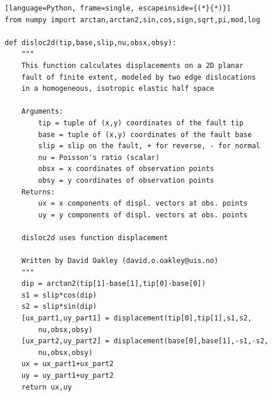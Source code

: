 \documentclass[a4paper , 12pt]{book}
\begin{document}
\begin{center}
\begin{lstlisting}[language=Python, frame=single, escapeinside={(*}{*)}]
from numpy import arctan,arctan2,sin,cos,sign,sqrt,pi,mod,log

def disloc2d(tip,base,slip,nu,obsx,obsy):
	"""
	This function calculates displacements on a 2D planar 
	fault of finite extent, modeled by two edge dislocations 
	in a homogeneous, isotropic elastic half space
	
	Arguments:
		tip = tuple of (x,y) coordinates of the fault tip
		base = tuple of (x,y) coordinates of the fault base
		slip = slip on the fault, + for reverse, - for normal
		nu = Poisson's ratio (scalar)
		obsx = x coordinates of observation points 
		obsy = y coordinates of observation points
	Returns:
		ux = x components of displ. vectors at obs. points 
		uy = y components of displ. vectors at obs. points
		
	disloc2d uses function displacement
	
	Written by David Oakley (david.o.oakley@uis.no)
	"""
	dip = arctan2(tip[1]-base[1],tip[0]-base[0])
	s1 = slip*cos(dip)
	s2 = slip*sin(dip)
	[ux_part1,uy_part1] = displacement(tip[0],tip[1],s1,s2,
		nu,obsx,obsy)
	[ux_part2,uy_part2] = displacement(base[0],base[1],-s1,-s2,
		nu,obsx,obsy)
	ux = ux_part1+ux_part2
	uy = uy_part1+uy_part2
	return ux,uy
	

\end{lstlisting}
\end{center}
\end{document}
